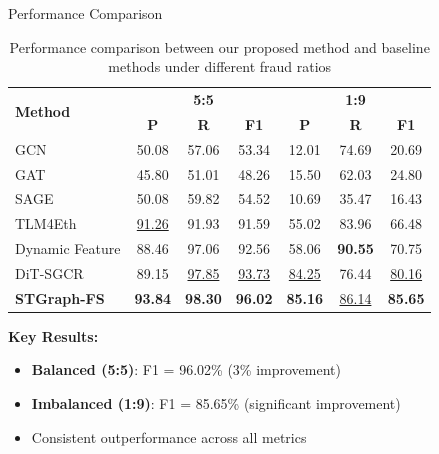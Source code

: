 \documentclass{beamer}
\begin{document}
\begin{frame}{Performance Comparison}
    \begin{table}
        \centering
        \tiny
        \caption{Performance comparison between our proposed method and baseline methods under different fraud ratios}
        \begin{tabular}{lccc|ccc}
            \hline
            \multirow{2}{*}{\textbf{Method}} & \multicolumn{3}{c|}{\textbf{5:5}} & \multicolumn{3}{c}{\textbf{1:9}} \\
             & \textbf{P} & \textbf{R} & \textbf{F1} & \textbf{P} & \textbf{R} & \textbf{F1} \\
            \hline
            GCN & 50.08 & 57.06 & 53.34 & 12.01 & 74.69 & 20.69 \\
            GAT & 45.80 & 51.01 & 48.26 & 15.50 & 62.03 & 24.80 \\
            SAGE & 50.08 & 59.82 & 54.52 & 10.69 & 35.47 & 16.43 \\
            TLM4Eth & \underline{91.26} & 91.93 & 91.59 & 55.02 & 83.96 & 66.48 \\
            Dynamic Feature & 88.46 & 97.06 & 92.56 & 58.06 & \textbf{90.55} & 70.75 \\
            DiT-SGCR & 89.15 & \underline{97.85} & \underline{93.73} & \underline{84.25} & 76.44 & \underline{80.16} \\
            \textbf{STGraph-FS} & \textbf{93.84} & \textbf{98.30} & \textbf{96.02} & \textbf{85.16} & \underline{86.14} & \textbf{85.65} \\
            \hline
        \end{tabular}
    \end{table}
    
    \vspace{0.3cm}
    \textbf{Key Results:}
    \begin{itemize}
        \item \textbf{Balanced (5:5)}: F1 = 96.02\% (3\% improvement)
        \item \textbf{Imbalanced (1:9)}: F1 = 85.65\% (significant improvement)
        \item Consistent outperformance across all metrics
    \end{itemize}
\end{frame}
\end{document}
